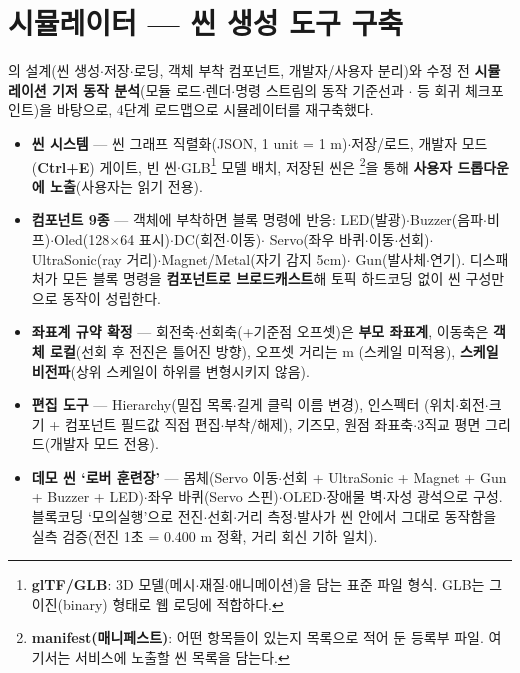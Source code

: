 \section{시뮬레이터 --- 씬 생성 도구 구축}
의 설계(씬 생성$\cdot$저장$\cdot$로딩, 객체 부착 컴포넌트, 개발자/사용자
분리)와 수정 전 \textbf{시뮬레이션 기저 동작 분석}(모듈 로드$\cdot$렌더$\cdot$명령 스트림의
동작 기준선과 $\cdot$ 등 회귀 체크포인트)을
바탕으로, 4단계 로드맵으로 시뮬레이터를 재구축했다.

\begin{itemize}
  \item \textbf{씬 시스템} --- 씬 그래프 직렬화(JSON, 1 unit = 1 m)$\cdot$저장/로드,
  개발자 모드(\textbf{Ctrl+E}) 게이트, 빈 씬$\cdot$GLB\footnote{\textbf{glTF/GLB}: 3D 모델(메시$\cdot$재질$\cdot$애니메이션)을 담는 표준 파일 형식. GLB는 그 이진(binary) 형태로 웹 로딩에 적합하다.} 모델 배치, 저장된 씬은
  \footnote{\textbf{manifest(매니페스트)}: 어떤 항목들이 있는지 목록으로 적어 둔 등록부 파일. 여기서는 서비스에 노출할 씬 목록을 담는다.}을 통해 \textbf{사용자 드롭다운에 노출}(사용자는 읽기 전용).
  \item \textbf{컴포넌트 9종} --- 객체에 부착하면 블록 명령에 반응:
  LED(발광)$\cdot$Buzzer(음파$\cdot$비프)$\cdot$Oled(128$\times$64 표시)$\cdot$DC(회전$\cdot$이동)$\cdot$%
  Servo(좌우 바퀴$\cdot$이동$\cdot$선회)$\cdot$UltraSonic(ray 거리)$\cdot$Magnet/Metal(자기 감지 5cm)$\cdot$%
  Gun(발사체$\cdot$연기). 디스패처가 모든 블록 명령을 \textbf{컴포넌트로 브로드캐스트}해
  토픽 하드코딩 없이 씬 구성만으로 동작이 성립한다.
  \item \textbf{좌표계 규약 확정} --- 회전축$\cdot$선회축(+기준점 오프셋)은 \textbf{부모
  좌표계}, 이동축은 \textbf{객체 로컬}(선회 후 전진은 틀어진 방향), 오프셋 거리는 m
  (스케일 미적용), \textbf{스케일 비전파}(상위 스케일이 하위를 변형시키지 않음).
  \item \textbf{편집 도구} --- Hierarchy(밀집 목록$\cdot$길게 클릭 이름 변경), 인스펙터
  (위치$\cdot$회전$\cdot$크기 + 컴포넌트 필드값 직접 편집$\cdot$부착/해제), 기즈모, 원점
  좌표축$\cdot$3직교 평면 그리드(개발자 모드 전용).
  \item \textbf{데모 씬 `로버 훈련장'} --- 몸체(Servo 이동$\cdot$선회 + UltraSonic + Magnet
  + Gun + Buzzer + LED)$\cdot$좌우 바퀴(Servo 스핀)$\cdot$OLED$\cdot$장애물 벽$\cdot$자성
  광석으로 구성. 블록코딩 `모의실행'으로 전진$\cdot$선회$\cdot$거리 측정$\cdot$발사가
  씬 안에서 그대로 동작함을 실측 검증(전진 1초 = 0.400 m 정확, 거리 회신 기하 일치).
\end{itemize}

